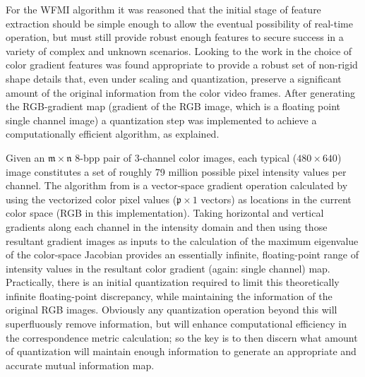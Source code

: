 %
%
%
%
%
%

%
%
%



For the WFMI algorithm it was reasoned that the initial stage of feature extraction should be simple enough to allow the eventual possibility of real-time operation, but must still provide robust enough features to secure success in a variety of complex and unknown scenarios. Looking to the work in \cite{Ugarriza2009} the choice of color gradient features was found appropriate to provide a robust set of non-rigid shape details that, even under scaling and quantization, preserve a significant amount of the original information from the color video frames. After generating the RGB-gradient map (gradient of the RGB image, which is a floating point single channel image) a quantization step was implemented to achieve a computationally efficient algorithm, as explained.

Given an $\mathfrak{m}\times\mathfrak{n}$ 8-bpp pair of 3-channel color images, each typical ($480\times640$) image constitutes a set of roughly 79 million possible pixel intensity values per channel. The algorithm from \cite{Lee1991} is a vector-space gradient operation calculated by using the vectorized color pixel values ($\mathfrak{p}\times1$ vectors) as locations in the current color space (\ie RGB in this implementation). Taking horizontal and vertical gradients along each channel in the intensity domain and then using those resultant gradient images as inputs to the calculation of the maximum eigenvalue of the color-space Jacobian provides an essentially infinite, floating-point range of intensity values in the resultant color gradient (again: single channel) map. Practically, there is an initial quantization required to limit this theoretically infinite floating-point discrepancy, while maintaining the information of the original RGB images. Obviously any quantization operation beyond this will superfluously remove information, but will enhance computational efficiency in the correspondence metric calculation; so the key is to then discern what amount of quantization will maintain enough information to generate an appropriate and accurate mutual information map.

